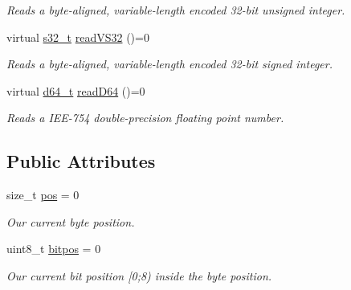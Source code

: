\begin{DoxyCompactItemize}
\begin{DoxyCompactList}\small\item\em Reads a byte-\/aligned, variable-\/length encoded 32-\/bit unsigned integer. \end{DoxyCompactList}\item 
\hypertarget{classjswf_1_1io_1_1_generic_reader_abff66404e36d68224b1e222c6632115b}{virtual \hyperlink{namespacejswf_a19b2a5980fe3b05994a2127a3c7e0521}{s32\+\_\+t} \hyperlink{classjswf_1_1io_1_1_generic_reader_abff66404e36d68224b1e222c6632115b}{read\+V\+S32} ()=0}\label{classjswf_1_1io_1_1_generic_reader_abff66404e36d68224b1e222c6632115b}

\begin{DoxyCompactList}\small\item\em Reads a byte-\/aligned, variable-\/length encoded 32-\/bit signed integer. \end{DoxyCompactList}\item 
\hypertarget{classjswf_1_1io_1_1_generic_reader_a56ad5cbf914f67d3633318093dfcb0d3}{virtual \hyperlink{namespacejswf_acfbb3c7c9fbb807e233387995eb76a96}{d64\+\_\+t} \hyperlink{classjswf_1_1io_1_1_generic_reader_a56ad5cbf914f67d3633318093dfcb0d3}{read\+D64} ()=0}\label{classjswf_1_1io_1_1_generic_reader_a56ad5cbf914f67d3633318093dfcb0d3}

\begin{DoxyCompactList}\small\item\em Reads a I\+E\+E-\/754 double-\/precision floating point number. \end{DoxyCompactList}\end{DoxyCompactItemize}
\subsection*{Public Attributes}
\begin{DoxyCompactItemize}
\item 
size\+\_\+t \hyperlink{classjswf_1_1io_1_1_generic_reader_a29dcfa1317485ea04e6caef568e803ce}{pos} = 0
\begin{DoxyCompactList}\small\item\em Our current byte position. \end{DoxyCompactList}\item 
\hypertarget{classjswf_1_1io_1_1_generic_reader_ab877457369b0cc359c724547c757ec7b}{uint8\+\_\+t \hyperlink{classjswf_1_1io_1_1_generic_reader_ab877457369b0cc359c724547c757ec7b}{bitpos} = 0}\label{classjswf_1_1io_1_1_generic_reader_ab877457369b0cc359c724547c757ec7b}

\begin{DoxyCompactList}\small\item\em Our current bit position \mbox{[}0;8) inside the byte position. \end{DoxyCompactList}\end{DoxyCompactItemize}


